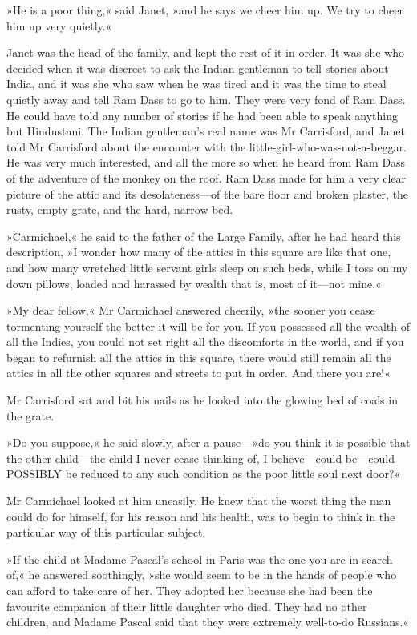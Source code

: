 »He is a poor thing,« said Janet, »and he says we cheer him up. We try to cheer him up very quietly.«

Janet was the head of the family, and kept the rest of it in order. It was she who decided when it was discreet to ask the Indian gentleman to tell stories about India, and it was she who saw when he was tired and it was the time to steal quietly away and tell Ram Dass to go to him. They were very fond of Ram Dass. He could have told any number of stories if he had been able to speak anything but Hindustani. The Indian gentleman's real name was Mr Carrisford, and Janet told Mr Carrisford about the encounter with the little-girl-who-was-not-a-beggar. He was very much interested, and all the more so when he heard from Ram Dass of the adventure of the monkey on the roof. Ram Dass made for him a very clear picture of the attic and its desolateness—of the bare floor and broken plaster, the rusty, empty grate, and the hard, narrow bed.

»Carmichael,« he said to the father of the Large Family, after he had heard this description, »I wonder how many of the attics in this square are like that one, and how many wretched little servant girls sleep on such beds, while I toss on my down pillows, loaded and harassed by wealth that is, most of it—not mine.«

»My dear fellow,« Mr Carmichael answered cheerily, »the sooner you cease tormenting yourself the better it will be for you. If you possessed all the wealth of all the Indies, you could not set right all the discomforts in the world, and if you began to refurnish all the attics in this square, there would still remain all the attics in all the other squares and streets to put in order. And there you are!«

Mr Carrisford sat and bit his nails as he looked into the glowing bed of coals in the grate.

»Do you suppose,« he said slowly, after a pause—»do you think it is possible that the other child—the child I never cease thinking of, I believe—could be—could POSSIBLY be reduced to any such condition as the poor little soul next door?«

Mr Carmichael looked at him uneasily. He knew that the worst thing the man could do for himself, for his reason and his health, was to begin to think in the particular way of this particular subject.

»If the child at Madame Pascal's school in Paris was the one you are in search of,« he answered soothingly, »she would seem to be in the hands of people who can afford to take care of her. They adopted her because she had been the favourite companion of their little daughter who died. They had no other children, and Madame Pascal said that they were extremely well-to-do Russians.«

